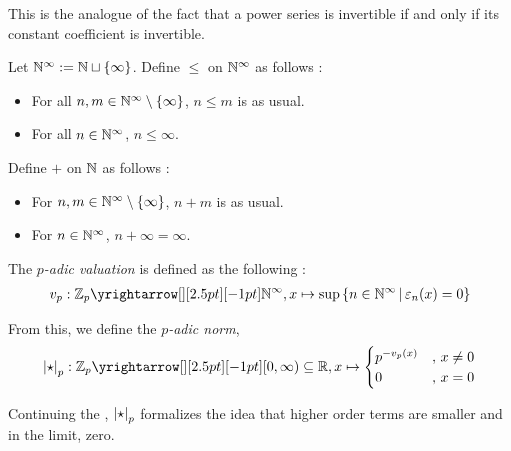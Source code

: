 \begin{rmk}
 
  This is the analogue of the fact that a power series is invertible 
  if and only if its constant coefficient is invertible. 
\end{rmk}

\begin{dfn}
  
  Let $\mathbb{N}^\infty := \mathbb{N} \sqcup \left\{\infty\right\}$.
  Define $\leq$ on $\mathbb{N}^\infty$ as follows : 
  \begin{itemize}
    \item For all $n, m \in \mathbb{N}^\infty\setminus\left\{\infty\right\}$, 
    $n \leq m$ is as usual. 
    \item For all $n \in \mathbb{N}^\infty$, $n \leq \infty$. 
  \end{itemize}

  Define $+$ on $\mathbb{N}$ as follows : 
  \begin{itemize}
    \item For $n, m \in \mathbb{N}^\infty\setminus\left\{\infty\right\}$, $n + m$ is as usual. 
    \item For $n \in \mathbb{N}^\infty$, $n + \infty = \infty$. 
  \end{itemize}
\end{dfn}

\begin{dfn}
  
  The \emph{$p$-adic valuation} is defined as the following : 
  \begin{align*}
    v_p : \map{\Z_p}{\N^\infty}{}{}, 
    x \mapsto \sup\set{n \in \N^\infty \st \ep_n(x) = 0}
  \end{align*}

  From this, we define the \emph{$p$-adic norm}, 
  \begin{align*}
    \abs{\star}_p : \map{\Z_p}{[0,\infty)\subs \R}{}{}, 
    x \mapsto \begin{cases}
      p^{-v_p(x)} &,\, x \neq 0 \\
      0 &,\, x = 0
    \end{cases}
  \end{align*}
\end{dfn}

\begin{rmk}
  
  Continuing the ,
  $\left\vert \star \right\vert_p$ formalizes the idea that 
  higher order terms are smaller and in the limit, zero. 
\end{rmk}

